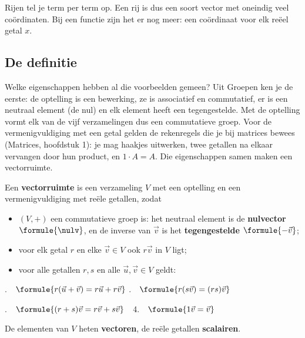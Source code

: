 Rijen tel je term per term op. Een rij is dus een soort vector met oneindig veel coördinaten. Bij een functie zijn het er nog meer: een coördinaat voor elk reëel getal $x$.

\subsection{De definitie}

Welke eigenschappen hebben al die voorbeelden gemeen? Uit Groepen ken je de eerste: de optelling is een bewerking, ze is associatief en commutatief, er is een neutraal element (de nul) en elk element heeft een tegengestelde. Met de optelling vormt elk van de vijf verzamelingen dus een commutatieve groep. Voor de vermenigvuldiging met een getal gelden de rekenregels die je bij matrices bewees (Matrices, hoofdstuk 1): je mag haakjes uitwerken, twee getallen na elkaar vervangen door hun product, en $1 \cdot A = A$. Die eigenschappen samen maken een vectorruimte.

\begin{theorie}
Een \textbf{\textcolor{accent}{vectorruimte}} is een verzameling $V$ met een optelling en een vermenigvuldiging met reële getallen, zodat

\vspace{1mm}
\begin{itemize}[leftmargin=8mm,itemsep=1mm]
\item $(V, +)$ een commutatieve groep is: het neutraal element is de \textbf{\textcolor{accent}{nulvector}} $\formule{\nulv}$, en de inverse van $\vec v$ is het \textbf{\textcolor{accent}{tegengestelde}} $\formule{-\vec v}$;
\item voor elk getal $r$ en elke $\vec v \in V$ ook $r\vec v$ in $V$ ligt;
\item voor alle getallen $r, s$ en alle $\vec u, \vec v \in V$ geldt:
\end{itemize}

\vspace{1mm}
.\ \ $\formule{r(\vec u + \vec v) = r\vec u + r\vec v}$ \qquad{}.\ \ $\formule{r(s\vec v) = (rs)\vec v}$

\vspace{1mm}
.\ \ $\formule{(r + s)\vec v = r\vec v + s\vec v}$ \qquad\qquad\ \,4.\ \ $\formule{1\vec v = \vec v}$

\vspace{1mm}
De elementen van $V$ heten \textbf{\textcolor{accent}{vectoren}}, de reële getallen \textbf{\textcolor{accent}{scalairen}}.
\end{theorie}


